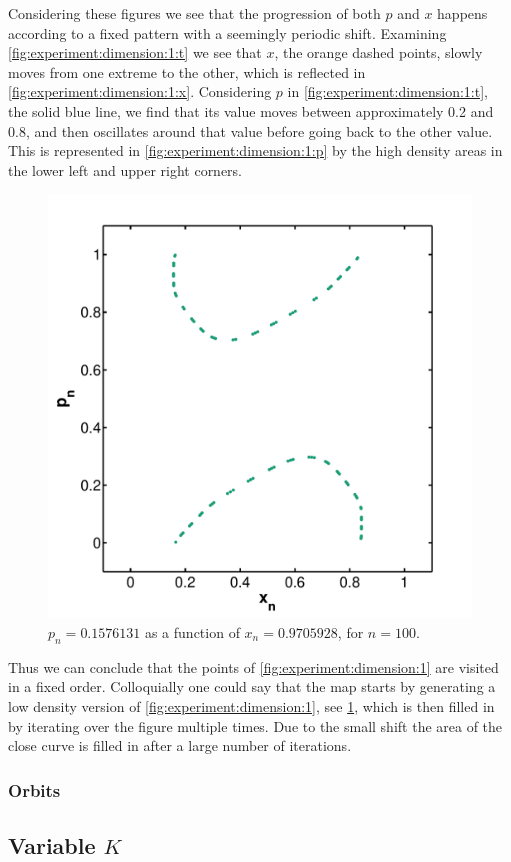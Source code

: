 	Considering these figures we see that the progression of both $p$ and $x$ happens according to a fixed pattern with a seemingly periodic shift. Examining \cref{fig:experiment:dimension:1:t} we see that $x$, the orange dashed points, slowly moves from one extreme to the other, which is reflected in \cref{fig:experiment:dimension:1:x}. Considering $p$ in \cref{fig:experiment:dimension:1:t}, the solid blue line, we find that its value moves between approximately 0.2 and 0.8, and then oscillates around that value before going back to the other value. This is represented in \cref{fig:experiment:dimension:1:p} by the high density areas in the lower left and upper right corners.

	\begin{figure}
		\centering
		\includegraphics[width=0.9\columnwidth]{./img/assignment_a_1_dim_n100}
		\caption{$p_n = \num{0.1576131}$ as a function of $x_n= \num{0.9705928}$, for $n = 100$.}
		\label{fig:experiment:a_1_n100}
	\end{figure}

	Thus we can conclude that the points of \cref{fig:experiment:dimension:1} are visited in a fixed order. Colloquially one could say that the map starts by generating a low density version of \cref{fig:experiment:dimension:1}, see \cref{fig:experiment:a_1_n100}, which is then filled in by iterating over the figure multiple times. Due to the small shift the area of the close curve is filled in after a large number of iterations.

	\subsubsection{Orbits}	

	

\subsection[]{Variable $K$}
\label{ss:variable}